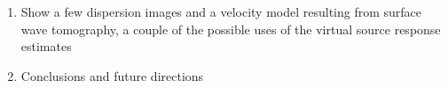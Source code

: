 \documentclass[11pt]{article}
\begin{document}
\begin{enumerate}
	\vspace{-0.2cm}
	\item Show a few dispersion images and a velocity model resulting from surface wave tomography, a couple of the possible uses of the virtual source response estimates
	\vspace{-0.2cm}
	\item Conclusions and future directions
	\end{enumerate}

















\end{document}
